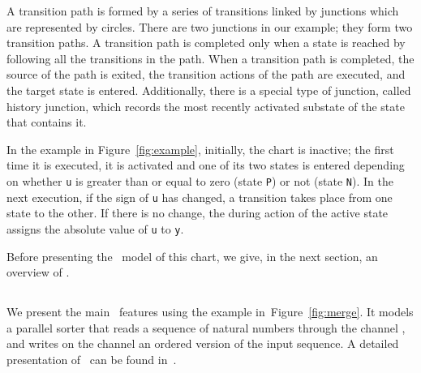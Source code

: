 \documentclass[submission]{eptcs}
\begin{document}
A transition path is formed by a series of transitions linked by junctions which are represented by circles. There are two junctions in our example; they form two transition paths. A transition path is completed only when a state is reached by following all the transitions in the path. When a transition path is completed, the source of the path is exited, the transition actions of the path are executed, and the target state is entered. Additionally, there is a special type of junction, called history junction, which records the most recently activated substate of the state that contains it.

In the example in Figure~\ref{fig:example}, initially, the chart is inactive; the first time it is executed, it is activated and one of its two states is entered depending on whether \texttt{u} is greater than or equal to zero (state \texttt{P}) or not (state \texttt{N}). In the next execution, if the sign of \texttt{u} has changed, a transition takes place from one state to the other. If there is no change, the during action of the active state assigns the absolute value of \texttt{u} to \texttt{y}.

Before presenting the \Circus~model of this chart, we give, in the next section, an overview of \Circus.

\subsection{\Circus}

We present the main \Circus\ features using the example in~Figure~\ref{fig:merge}. It models a parallel sorter that reads a sequence of natural numbers through the channel , and writes on the channel  an ordered version of the input sequence. A detailed presentation of \Circus\ can be found in~\cite{Woodcock2002}.
\end{document}
